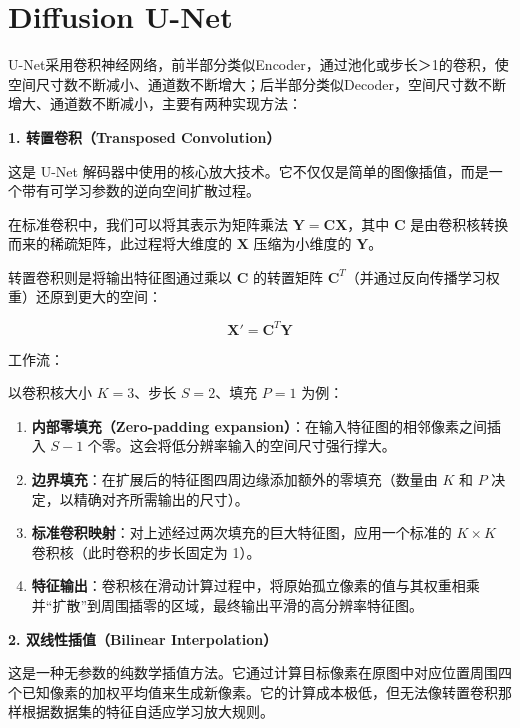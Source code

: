 \setcounter{section}{2}

\hypertarget{diffusion-u-net}{%
\section{Diffusion U-Net}\label{diffusion-u-net}}

U-Net采用卷积神经网络，前半部分类似Encoder，通过池化或步长＞1的卷积，使空间尺寸数不断减小、通道数不断增大；后半部分类似Decoder，空间尺寸数不断增大、通道数不断减小，主要有两种实现方法：

\textbf{1. 转置卷积（Transposed Convolution）}

这是 U-Net 解码器中使用的核心放大技术。它不仅仅是简单的图像插值，而是一个带有可学习参数的逆向空间扩散过程。

在标准卷积中，我们可以将其表示为矩阵乘法 \(\mathbf{Y}=\mathbf{C}\mathbf{X}\)，其中 \(\mathbf{C}\) 是由卷积核转换而来的稀疏矩阵，此过程将大维度的 \(\mathbf{X}\) 压缩为小维度的 \(\mathbf{Y}\)。

转置卷积则是将输出特征图通过乘以 \(\mathbf{C}\) 的转置矩阵 \(\mathbf{C}^T\)（并通过反向传播学习权重）还原到更大的空间：

\[
\mathbf{X}'=\mathbf{C}^T\mathbf{Y}
\]

工作流：

以卷积核大小 \(K=3\)、步长 \(S=2\)、填充 \(P=1\) 为例：

\begin{enumerate}
\def\labelenumi{\arabic{enumi}.}
\tightlist
\item
  \textbf{内部零填充（Zero-padding expansion）}：在输入特征图的相邻像素之间插入 \(S-1\) 个零。这会将低分辨率输入的空间尺寸强行撑大。
\item
  \textbf{边界填充}：在扩展后的特征图四周边缘添加额外的零填充（数量由 \(K\) 和 \(P\) 决定，以精确对齐所需输出的尺寸）。
\item
  \textbf{标准卷积映射}：对上述经过两次填充的巨大特征图，应用一个标准的 \(K\times K\) 卷积核（此时卷积的步长固定为 1）。
\item
  \textbf{特征输出}：卷积核在滑动计算过程中，将原始孤立像素的值与其权重相乘并``扩散''到周围插零的区域，最终输出平滑的高分辨率特征图。
\end{enumerate}

\textbf{2. 双线性插值（Bilinear Interpolation）}

这是一种无参数的纯数学插值方法。它通过计算目标像素在原图中对应位置周围四个已知像素的加权平均值来生成新像素。它的计算成本极低，但无法像转置卷积那样根据数据集的特征自适应学习放大规则。


